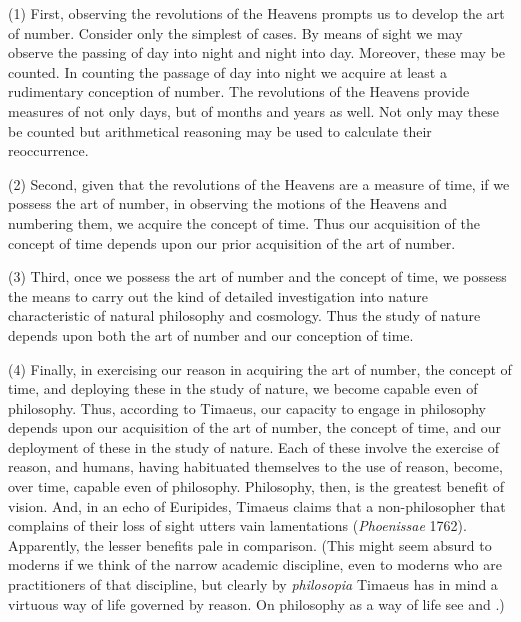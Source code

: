 (1) First, observing the revolutions of the Heavens prompts us to develop the art of number. Consider only the simplest of cases. By means of sight we may observe the passing of day into night and night into day. Moreover, these may be counted. In counting the passage of day into night we acquire at least a rudimentary conception of number. The revolutions of the Heavens provide measures of not only days, but of months and years as well. Not only may these be counted but arithmetical reasoning may be used to calculate their reoccurrence. 

(2) Second, given that the revolutions of the Heavens are a measure of time, if we possess the art of number, in observing the motions of the Heavens and numbering them, we acquire the concept of time. Thus our acquisition of the concept of time depends upon our prior acquisition of the art of number.

(3) Third, once we possess the art of number and the concept of time, we possess the means to carry out the kind of detailed investigation into nature characteristic of natural philosophy and cosmology. Thus the study of nature depends upon both the art of number and our conception of time.

(4) Finally, in exercising our reason in acquiring the art of number, the concept of time, and deploying these in the study of nature, we become capable even of philosophy. Thus, according to Timaeus, our capacity to engage in philosophy depends upon our acquisition of the art of number, the concept of time, and our deployment of these in the study of nature. Each of these involve the exercise of reason, and humans, having habituated themselves to the use of reason, become, over time, capable even of philosophy. Philosophy, then, is the greatest benefit of vision. And, in an echo of Euripides, Timaeus claims that a non-philosopher that complains of their loss of sight utters vain lamentations (\emph{Phoenissae} 1762). Apparently, the lesser benefits pale in comparison. (This might seem absurd to moderns if we think of the narrow academic discipline, even to moderns who are practitioners of that discipline, but clearly by \emph{philosopia} Timaeus has in mind a virtuous way of life governed by reason. On philosophy as a way of life see \citealt{Hadot:1997aa,Hadot:2002aa} and \citealt{Cooper:2012aa}.)

